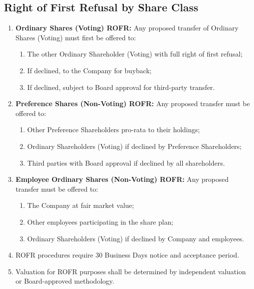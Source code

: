 \subsection{Right of First Refusal by Share Class} \label{subsec:ROFR}
\begin{enumerate}[label=(\alph*)]
\item \textbf{Ordinary Shares (Voting) ROFR:} Any proposed transfer of Ordinary Shares (Voting) must first be offered to:
    \begin{enumerate}[label=(\roman*)]
    \item The other Ordinary Shareholder (Voting) with full right of first refusal;
    \item If declined, to the Company for buyback;
    \item If declined, subject to Board approval for third-party transfer.
    \end{enumerate}
\item \textbf{Preference Shares (Non-Voting) ROFR:} Any proposed transfer must be offered to:
    \begin{enumerate}[label=(\roman*)]
    \item Other Preference Shareholders pro-rata to their holdings;
    \item Ordinary Shareholders (Voting) if declined by Preference Shareholders;
    \item Third parties with Board approval if declined by all shareholders.
    \end{enumerate}
\item \textbf{Employee Ordinary Shares (Non-Voting) ROFR:} Any proposed transfer must be offered to:
    \begin{enumerate}[label=(\roman*)]
    \item The Company at fair market value;
    \item Other employees participating in the share plan;
    \item Ordinary Shareholders (Voting) if declined by Company and employees.
    \end{enumerate}
\item ROFR procedures require 30 Business Days notice and acceptance period.
\item Valuation for ROFR purposes shall be determined by independent valuation or Board-approved methodology.
\end{enumerate}

